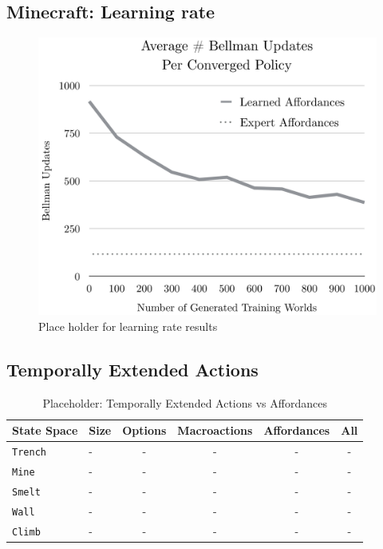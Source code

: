 \documentclass[conference]{IEEEtran}
\begin{document}
\subsection{Minecraft: Learning rate}

\begin{figure}[H]
\centering
\includegraphics[scale=0.195]{figures/training_results.png}%
  \caption{Place holder for learning rate results}
  \label{fig:training_results}
\end{figure}

\subsection{Temporally Extended Actions}

\begin{table}[H]
\centering
\begin{tabular}{ l l || c c c c }
  State Space 		&	Size 	&	Options 	& Macroactions & Affordances  & 	All 	\\ \hline
  \texttt{Trench}  	& 	-	&	-		&	-	&	-			&	-	\\
  \texttt{Mine}  		& 	-	&	-		&	-	&	-  			&	-	\\
  \texttt{Smelt}  		& 	-	&	-		&	-	&	-  			&	-	\\
  \texttt{Wall}  		& 	-	&	-		&	-	&	-			&	-	\\
  \texttt{Climb}  		& 	-	&	-		&	-	&	- 			&	-	\\
\end{tabular}
\caption{Placeholder: Temporally Extended Actions vs Affordances}
\label{table:minecraft_results_cpu}
\end{table}
\end{document}
